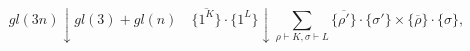 \begin{equation}
	gl(3n) \downarrow gl(3)+gl(n) \quad 
{\{}\overline{ 1^{K}} {\}}\cdot {\{} 1^{L}{\}} 
\downarrow \sum_{\rho \vdash K, \sigma \vdash L} {\{} \overline{\rho'} {\}}\cdot {\{} \sigma' {\}} \times
{\{} \overline{\rho} {\}}\cdot {\{} \sigma {\}},
\label{eq:Gl3GlnDecomp}
\end{equation}

